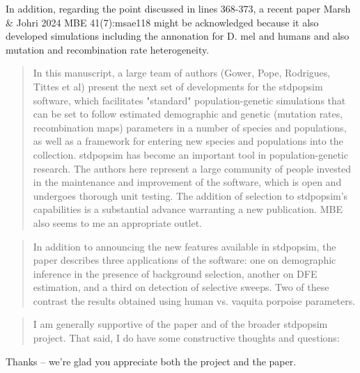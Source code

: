   \begin{point}{\revref} %
    In addition, regarding the point discussed in lines 368-373, a recent paper Marsh \& Johri 2024 MBE 41(7):msae118 
    might be acknowledged because it also developed simulations including the annonation for D. mel and humans and also mutation and recombination rate heterogeneity. 
  \end{point}
  
  
  \begin{quote}
    \color{gray}
    In this manuscript, a large team of authors (Gower, Pope, Rodrigues, Tittes et al) present the next 
    set of developments for the stdpopsim software, which facilitates "standard" population-genetic 
    simulations that can be set to follow estimated demographic and genetic (mutation rates, recombination maps) 
    parameters in a number of species and populations, as well as a framework for entering new species and populations 
    into the collection. stdpopsim has become an important tool in population-genetic research. 
    The authors here represent a large community of people invested in the maintenance and improvement of the software, 
    which is open and undergoes thorough unit testing. 
    The addition of selection to stdpopsim's capabilities is a substantial advance warranting a new publication. 
    MBE also seems to me an appropriate outlet.  
\end{quote}
  
  \begin{quote}
    \color{gray}
    In addition to announcing the new features available in stdpopsim, the paper describes three applications of the software: 
    one on demographic inference in the presence of background selection, another on DFE estimation, and a third on detection of selective sweeps. 
    Two of these contrast the results obtained using human vs. vaquita porpoise parameters.  
\end{quote}
  
  \begin{quote}
    \color{gray}
    I am generally supportive of the paper and of the broader stdpopsim project. 
    That said, I do have some constructive thoughts and questions:  \end{quote}
  
  Thanks -- we're glad you appreciate both the project and the paper.
  
